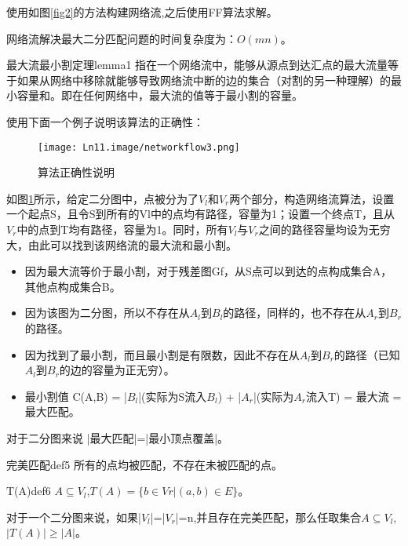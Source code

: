 使用如图\ref{fig2}的方法构建网络流,之后使用FF算法求解。

网络流解决最大二分匹配问题的时间复杂度为：\(O(mn)\)。

\begin{lemma}{最大流最小割定理}{lemma1}
    指在一个网络流中，能够从源点到达汇点的最大流量等于如果从网络中移除就能够导致网络流中断的边的集合（对割的另一种理解）的最小容量和。即在任何网络中，最大流的值等于最小割的容量。
\end{lemma}

使用下面一个例子说明该算法的正确性：
\begin{figure}[htb]
  \centering
  \texttt{[image: Ln11.image/networkflow3.png]}
  \caption{算法正确性说明}\label{fig3}
\end{figure}

\begin{example}
  如图\ref{fig3}所示，给定二分图中，点被分为了\(V_l\)和\(V_r\)两个部分，构造网络流算法，设置一个起点S，且令S到所有的Vl中的点均有路径，容量为1；设置一个终点T，且从\(V_r\)中的点到T均有路径，容量为1。同时，所有\(V_l\)与\(V_r\)之间的路径容量均设为无穷大，由此可以找到该网络流的最大流和最小割。
\end{example}

\begin{itemize}
  \item 因为最大流等价于最小割，对于残差图Gf，从S点可以到达的点构成集合A，其他点构成集合B。
  \item 因为该图为二分图，所以不存在从\(A_l\)到\(B_l\)的路径，同样的，也不存在从\(A_r\)到\(B_r\)的路径。
  \item 因为找到了最小割，而且最小割是有限数，因此不存在从\(A_l\)到\(B_r\)的路径（已知\(A_l\)到\(B_r\)的边的容量为正无穷）。
  \item 最小割值 C(A,B) = |\(B_l\)|(实际为S流入\(B_l\)) + |\(A_r\)|(实际为\(A_r\)流入T) = 最大流 = 最大匹配。
\end{itemize}
对于二分图来说 |最大匹配|=|最小顶点覆盖|。

\begin{definition}{完美匹配}{def5}
    所有的点均被匹配，不存在未被匹配的点。
\end{definition}

\begin{definition}{T(A)}{def6}
  \(A \subseteq V_l\),\(T(A) = \{b \in Vr | (a,b) \in E \}\)。
\end{definition}

对于一个二分图来说，如果|\(V_l\)|=|\(V_r\)|=n,并且存在完美匹配，那么任取集合\(A \subseteq V_l\),\(|T(A)| \ge |A|\)。

